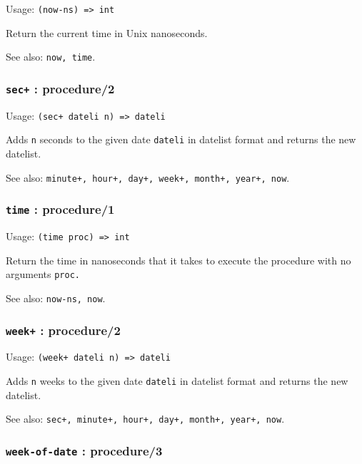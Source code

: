 \documentclass[
]{article}
\newcommand{\passthrough}[1]{#1}
\begin{document}
Usage: \passthrough{\lstinline!(now-ns) => int!}

Return the current time in Unix nanoseconds.

See also: \passthrough{\lstinline!now, time!}.

\hypertarget{sec-procedure2}{%
\subsubsection{\texorpdfstring{\texttt{sec+} :
procedure/2}{sec+ : procedure/2}}\label{sec-procedure2}}

Usage: \passthrough{\lstinline!(sec+ dateli n) => dateli!}

Adds \passthrough{\lstinline!n!} seconds to the given date
\passthrough{\lstinline!dateli!} in datelist format and returns the new
datelist.

See also:
\passthrough{\lstinline!minute+, hour+, day+, week+, month+, year+, now!}.

\hypertarget{time-procedure1}{%
\subsubsection{\texorpdfstring{\texttt{time} :
procedure/1}{time : procedure/1}}\label{time-procedure1}}

Usage: \passthrough{\lstinline!(time proc) => int!}

Return the time in nanoseconds that it takes to execute the procedure
with no arguments \passthrough{\lstinline!proc.!}

See also: \passthrough{\lstinline!now-ns, now!}.

\hypertarget{week-procedure2}{%
\subsubsection{\texorpdfstring{\texttt{week+} :
procedure/2}{week+ : procedure/2}}\label{week-procedure2}}

Usage: \passthrough{\lstinline!(week+ dateli n) => dateli!}

Adds \passthrough{\lstinline!n!} weeks to the given date
\passthrough{\lstinline!dateli!} in datelist format and returns the new
datelist.

See also:
\passthrough{\lstinline!sec+, minute+, hour+, day+, month+, year+, now!}.

\hypertarget{week-of-date-procedure3}{%
\subsubsection{\texorpdfstring{\texttt{week-of-date} :
procedure/3}{week-of-date : procedure/3}}\label{week-of-date-procedure3}}
\end{document}
